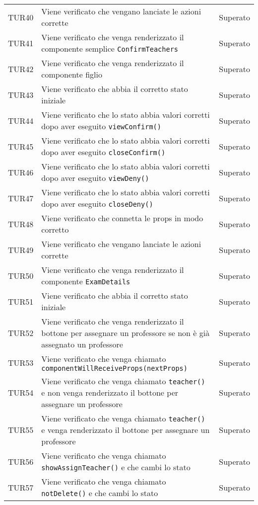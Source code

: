 \documentclass[PianoDiQualifica.tex]{subfiles}
\begin{document}
\begin{longtable}[H]{P{2cm}P{8.5cm}P{3cm}}
	TUR40 & Viene verificato che vengano lanciate le azioni corrette & Superato \\ 
	TUR41 & Viene verificato che venga renderizzato il componente semplice \texttt{ConfirmTeachers} & Superato \\ 
	TUR42 & Viene verificato che venga renderizzato il componente figlio & Superato \\ 
	TUR43 & Viene verificato che abbia il corretto stato iniziale & Superato \\ 
	TUR44 & Viene verificato che lo stato abbia valori corretti dopo aver eseguito \texttt{viewConfirm()} & Superato \\ 
	TUR45 & Viene verificato che lo stato abbia valori corretti dopo aver eseguito \texttt{closeConfirm()} & Superato \\ 
	TUR46 & Viene verificato che lo stato abbia valori corretti dopo aver eseguito \texttt{viewDeny()} & Superato \\ 
	TUR47 & Viene verificato che lo stato abbia valori corretti dopo aver eseguito \texttt{closeDeny()} & Superato \\ 
	TUR48 & Viene verificato che connetta le props in modo corretto & Superato \\ 
	TUR49 & Viene verificato che vengano lanciate le azioni corrette & Superato \\ 
	TUR50 & Viene verificato che venga renderizzato il componente \texttt{ExamDetails} & Superato \\ 
	TUR51 & Viene verificato che abbia il corretto stato iniziale & Superato \\ 
	TUR52 & Viene verificato che venga renderizzato il bottone per assegnare un professore se non è già assegnato un professore & Superato \\ 
	TUR53 & Viene verificato che venga chiamato \texttt{componentWillReceiveProps(nextProps)} & Superato \\ 
	TUR54 & Viene verificato che venga chiamato \texttt{teacher()} e non venga renderizzato il bottone per assegnare un professore & Superato \\ 
	TUR55 & Viene verificato che venga chiamato \texttt{teacher()} e venga renderizzato il bottone per assegnare un professore & Superato \\ 
	TUR56 & Viene verificato che venga chiamato \texttt{showAssignTeacher()} e che cambi lo stato & Superato \\ 
	TUR57 & Viene verificato che venga chiamato \texttt{notDelete()} e che cambi lo stato & Superato \\ 

\end{longtable}
\end{document}
